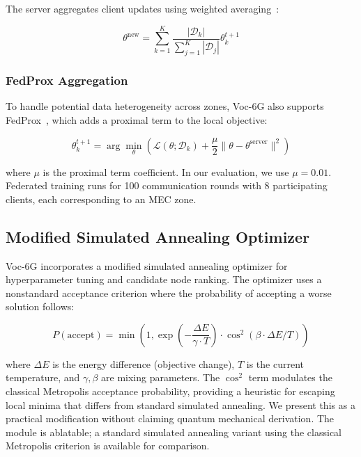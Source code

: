 \documentclass[10pt,letterpaper]{article}
\providecommand{\VocSixG}{Voc-6G}
\begin{document}
The server aggregates client updates using weighted averaging~\cite{mcmahan2017fedavg}:

\begin{equation}
\theta^{\text{new}} = \sum_{k=1}^{K} \frac{|\mathcal{D}_k|}{\sum_{j=1}^{K} |\mathcal{D}_j|} \theta_k^{t+1}
\end{equation}

\subsubsection{FedProx Aggregation}

To handle potential data heterogeneity across zones, \VocSixG{} also supports FedProx~\cite{lim2021federated}, which adds a proximal term to the local objective:

\begin{equation}
\theta_k^{t+1} = \arg\min_\theta \left( \mathcal{L}(\theta; \mathcal{D}_k) + \frac{\mu}{2} \|\theta - \theta^{\text{server}}\|^2 \right)
\end{equation}

where $\mu$ is the proximal term coefficient. In our evaluation, we use $\mu=0.01$. Federated training runs for 100 communication rounds with 8 participating clients, each corresponding to an MEC zone.

\subsection*{Modified Simulated Annealing Optimizer}
\label{sec:optimizer}

\VocSixG{} incorporates a modified simulated annealing optimizer for hyperparameter tuning and candidate node ranking. The optimizer uses a nonstandard acceptance criterion where the probability of accepting a worse solution follows:

\begin{equation}
P(\text{accept}) = \min\left(1, \exp\left(-\frac{\Delta E}{\gamma \cdot T}\right) \cdot \cos^2(\beta \cdot \Delta E / T)\right)
\label{eq:sa}
\end{equation}

where $\Delta E$ is the energy difference (objective change), $T$ is the current temperature, and $\gamma, \beta$ are mixing parameters. The $\cos^2$ term modulates the classical Metropolis acceptance probability, providing a heuristic for escaping local minima that differs from standard simulated annealing. We present this as a practical modification without claiming quantum mechanical derivation. The module is ablatable; a standard simulated annealing variant using the classical Metropolis criterion is available for comparison.
\end{document}

